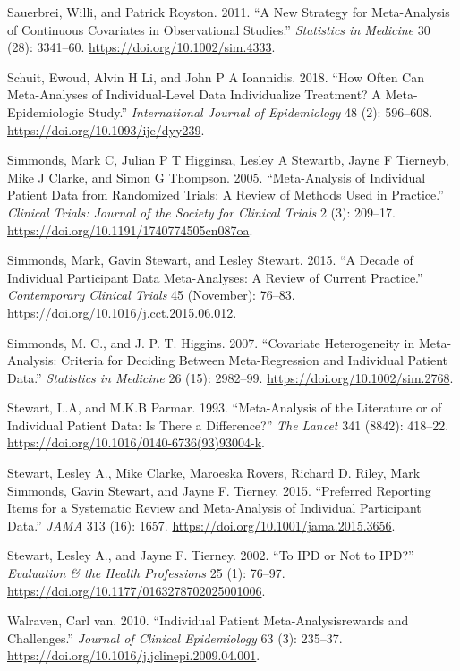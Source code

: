 \documentclass[]{article}
\begin{document}
\leavevmode\hypertarget{ref-Sauerbrei_2011}{}%
Sauerbrei, Willi, and Patrick Royston. 2011. ``A New Strategy for
Meta-Analysis of Continuous Covariates in Observational Studies.''
\emph{Statistics in Medicine} 30 (28): 3341--60.
\url{https://doi.org/10.1002/sim.4333}.

\leavevmode\hypertarget{ref-Schuit_2018}{}%
Schuit, Ewoud, Alvin H Li, and John P A Ioannidis. 2018. ``How Often Can
Meta-Analyses of Individual-Level Data Individualize Treatment? A
Meta-Epidemiologic Study.'' \emph{International Journal of Epidemiology}
48 (2): 596--608. \url{https://doi.org/10.1093/ije/dyy239}.

\leavevmode\hypertarget{ref-Simmonds_2005}{}%
Simmonds, Mark C, Julian P T Higginsa, Lesley A Stewartb, Jayne F
Tierneyb, Mike J Clarke, and Simon G Thompson. 2005. ``Meta-Analysis of
Individual Patient Data from Randomized Trials: A Review of Methods Used
in Practice.'' \emph{Clinical Trials: Journal of the Society for
Clinical Trials} 2 (3): 209--17.
\url{https://doi.org/10.1191/1740774505cn087oa}.

\leavevmode\hypertarget{ref-Simmonds_2015}{}%
Simmonds, Mark, Gavin Stewart, and Lesley Stewart. 2015. ``A Decade of
Individual Participant Data Meta-Analyses: A Review of Current
Practice.'' \emph{Contemporary Clinical Trials} 45 (November): 76--83.
\url{https://doi.org/10.1016/j.cct.2015.06.012}.

\leavevmode\hypertarget{ref-Simmonds_2007}{}%
Simmonds, M. C., and J. P. T. Higgins. 2007. ``Covariate Heterogeneity
in Meta-Analysis: Criteria for Deciding Between Meta-Regression and
Individual Patient Data.'' \emph{Statistics in Medicine} 26 (15):
2982--99. \url{https://doi.org/10.1002/sim.2768}.

\leavevmode\hypertarget{ref-Stewart_1993}{}%
Stewart, L.A, and M.K.B Parmar. 1993. ``Meta-Analysis of the Literature
or of Individual Patient Data: Is There a Difference?'' \emph{The
Lancet} 341 (8842): 418--22.
\url{https://doi.org/10.1016/0140-6736(93)93004-k}.

\leavevmode\hypertarget{ref-Stewart_2015}{}%
Stewart, Lesley A., Mike Clarke, Maroeska Rovers, Richard D. Riley, Mark
Simmonds, Gavin Stewart, and Jayne F. Tierney. 2015. ``Preferred
Reporting Items for a Systematic Review and Meta-Analysis of Individual
Participant Data.'' \emph{JAMA} 313 (16): 1657.
\url{https://doi.org/10.1001/jama.2015.3656}.

\leavevmode\hypertarget{ref-Stewart_2002}{}%
Stewart, Lesley A., and Jayne F. Tierney. 2002. ``To IPD or Not to
IPD?'' \emph{Evaluation \& the Health Professions} 25 (1): 76--97.
\url{https://doi.org/10.1177/0163278702025001006}.

\leavevmode\hypertarget{ref-van_Walraven_2010}{}%
Walraven, Carl van. 2010. ``Individual Patient Meta-Analysisrewards and
Challenges.'' \emph{Journal of Clinical Epidemiology} 63 (3): 235--37.
\url{https://doi.org/10.1016/j.jclinepi.2009.04.001}.
\end{document}

